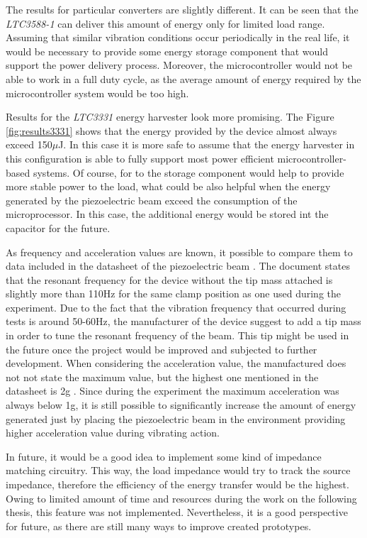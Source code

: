 \documentclass[12pt,a4paper]{article}
\begin{document}
The results for particular converters are slightly different. It can be seen that the \textit{LTC3588-1} can deliver this amount of energy only for limited load range. Assuming that similar vibration conditions occur periodically in the real life, it would be necessary to provide some energy storage component that would support the power delivery process. Moreover, the microcontroller would not be able to work in a full duty cycle, as the average amount of energy required by the microcontroller system would be too high.
\par
Results for the \textit{LTC3331} energy harvester look more promising. The Figure \ref{fig:results3331} shows that the energy provided by the device almost always exceed 150$\mu$J. In this case it is more safe to assume that the energy harvester in this configuration is able to fully support most power efficient microcontroller-based systems. Of course, for to the storage component would help to provide more stable power to the load, what could be also helpful when the energy generated by the piezoelectric beam exceed the consumption of the microprocessor. In this case, the additional energy would be stored int the capacitor for the future.
\par
As frequency and acceleration values are known, it possible to compare them to data included in the datasheet of the piezoelectric beam \cite{PPA}. The document states that the resonant frequency for the device without the tip mass attached is slightly more than 110Hz for the same clamp position as one used during the experiment. Due to the fact that the vibration frequency that occurred during tests is around 50-60Hz, the manufacturer of the device suggest to add a tip mass in order to tune the resonant frequency of the beam. This tip might be used in the future once the project would be improved and subjected to further development. When considering the acceleration value, the manufactured does not not state the maximum value, but the highest one mentioned in the datasheet is 2g \cite{PPA}. Since during the experiment the maximum acceleration was always below 1g, it is still possible to significantly increase the amount of energy generated just by placing the piezoelectric beam in the environment providing higher acceleration value during vibrating action.
\par

In future, it would be a good idea to implement some kind of impedance matching circuitry. This way, the load impedance would try to track the source impedance, therefore the efficiency of the energy transfer would be the highest. Owing to limited amount of time and resources during the work on the following thesis, this feature was not implemented. Nevertheless, it is a good perspective for future, as there are still many ways to improve created prototypes.
\par
\end{document}
